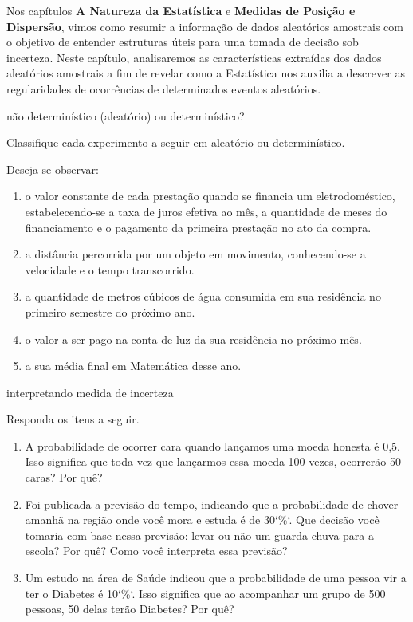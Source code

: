 Nos capítulos \textbf{A Natureza da Estatística} e \textbf{Medidas de Posição e Dispersão}, vimos como resumir a informação de dados aleatórios amostrais com o objetivo de  entender estruturas úteis para uma tomada de decisão sob incerteza. Neste capítulo, analisaremos as características extraídas dos dados aleatórios amostrais a fim de revelar como a Estatística nos auxilia a descrever as regularidades de ocorrências de determinados eventos aleatórios.
\pagebreak

\begin{task}{não determinístico (aleatório) ou determinístico?}

Classifique cada experimento a seguir em aleatório ou determinístico.

Deseja-se observar:
\begin{enumerate}[rightmargin=3mm]
\item 
o valor constante de cada prestação quando se financia um eletrodoméstico, estabelecendo-se a taxa de juros efetiva ao mês, a quantidade de meses do financiamento e o pagamento da primeira prestação no ato da compra.

\item 
a distância percorrida por um objeto em movimento, conhecendo-se a velocidade e o tempo transcorrido.

\item 
a quantidade de metros cúbicos de água consumida em sua residência no primeiro semestre do próximo ano.

\item 
o valor a ser pago na conta de luz da sua residência no próximo mês.

\item 
a sua média final em Matemática desse ano.

\end{enumerate}
\end{task}
\begin{task}{interpretando medida de incerteza}


Responda os itens a seguir.
\begin{enumerate}
\item {} 
A probabilidade de ocorrer cara quando lançamos uma moeda honesta é 0,5. Isso significa que toda vez que lançarmos essa moeda 100 vezes, ocorrerão 50 caras? Por quê?

\item {} 
Foi publicada a previsão do tempo, indicando que a probabilidade de chover amanhã na região onde você mora e estuda é de 30{}`\%{}`. Que decisão você tomaria com base nessa previsão: levar ou não um guarda-chuva para a escola? Por quê? Como você interpreta essa previsão?

\item {} 
Um estudo na área de Saúde indicou que a probabilidade de uma pessoa vir a ter o Diabetes é 10{}`\%{}`. Isso significa que ao acompanhar um grupo de 500 pessoas, 50 delas terão Diabetes? Por quê?

\end{enumerate}
\end{task}

